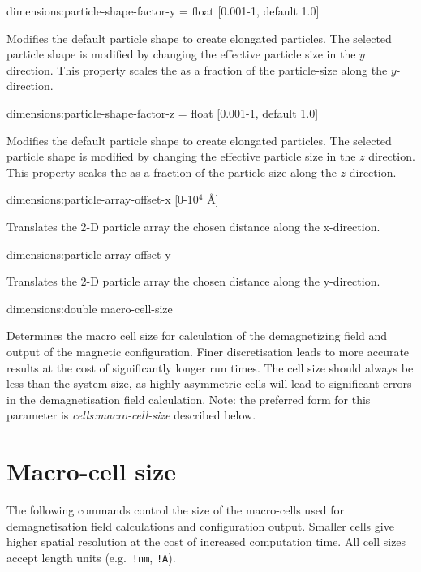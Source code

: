 {\zicf dimensions:particle-shape-factor-y = float [0.001-1, default 1.0]} 
Modifies the default particle shape to create elongated particles. The selected
particle shape is modified by changing the effective particle size in the $y$
direction. This property scales the as a fraction of the particle-size along the
$y$-direction.

{\zicf dimensions:particle-shape-factor-z = float [0.001-1, default 1.0]}
Modifies the default particle shape to create elongated particles. The selected
particle shape is modified by changing the effective particle size in the $z$
direction. This property scales the as a fraction of the particle-size along the
$z$-direction.

{\zicf dimensions:particle-array-offset-x [0-10$^4$ \AA]}
Translates the 2-D particle array the chosen distance along the x-direction.

{\zicf dimensions:particle-array-offset-y}
Translates the 2-D particle array the chosen distance along the y-direction.

{\zicf dimensions:double macro-cell-size}
Determines the macro cell size for calculation of the demagnetizing field and
output of the magnetic configuration. Finer discretisation leads to more
accurate results at the cost of significantly longer run times. The cell size
should always be less than the system size, as highly asymmetric cells will lead
to significant errors in the demagnetisation field calculation. Note: the preferred form for this parameter is \textit{cells:macro-cell-size} described below.

\section*{Macro-cell size}
The following commands control the size of the macro-cells used for demagnetisation field calculations and configuration output. Smaller cells give higher spatial resolution at the cost of increased computation time. All cell sizes accept length units (e.g.\ \texttt{!nm}, \texttt{!A}).

